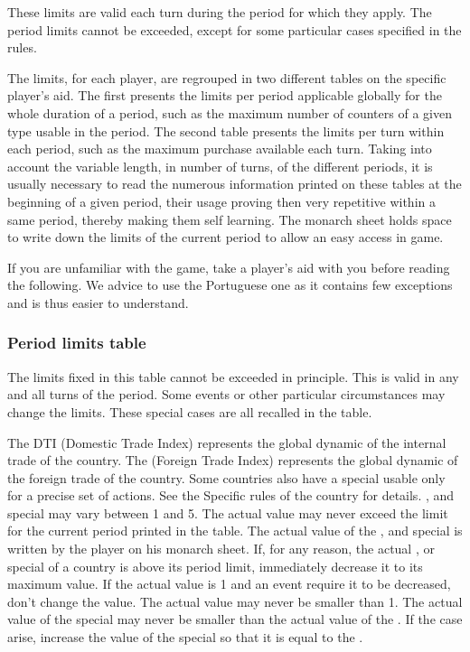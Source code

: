 \aparag[Limits] These limits are valid each turn during the period for which
they apply.
\bparag The period limits cannot be exceeded, except for some particular cases
specified in the rules.

 The limits, for each player, are regrouped in two
different tables on the specific player's aid. The first presents the limits
per period applicable globally for the whole duration of a period, such as the
maximum number of counters of a given type usable in the period. The second
table presents the limits per turn within each period, such as the maximum
purchase available each turn.
\bparag Taking into account the variable length, in number of turns, of the
different periods, it is usually necessary to read the numerous information
printed on these tables at the beginning of a given period, their usage
proving then very repetitive within a same period, thereby making them self
learning.
\bparag The monarch sheet holds space to write down the limits of the current
period to allow an easy access in game.

\begin{exemple}
  If you are unfamiliar with the game, take a player's aid with you before
  reading the following. We advice to use the Portuguese one as it contains
  few exceptions and is thus easier to understand.
\end{exemple}


\subsubsection{Period limits table}
\label{chThePowers:Period Limits}
\aparag The limits fixed in this table cannot be exceeded in principle. This
is valid in any and all turns of the period.
\bparag Some events or other particular circumstances may change the
limits. These special cases are all recalled in the table.

\aparag[Trade] The DTI (Domestic Trade Index) represents the global dynamic of
the internal trade of the country. The \FTI (Foreign Trade Index) represents
the global dynamic of the foreign trade of the country.
\bparag Some countries also have a special \FTI usable only for a precise set
of actions. See the Specific rules of the country for details.
\bparag \DTI, \FTI and special \FTI may vary between 1 and 5.
\bparag The actual value may never exceed the limit for the current period
printed in the table.
\bparag The actual value of the \DTI, \FTI and special \FTI is written by the
player on his monarch sheet.
\bparag If, for any reason, the actual \DTI, \FTI or special \FTI of a country
is above its period limit, %
immediately decrease it to its maximum value.
\bparag If the actual value is 1 and an event require it to be decreased, %
don't change the value. The actual value may never be smaller than 1.
\bparag The actual value of the special \FTI may never be smaller than the
actual value of the \FTI. If the case arise, increase the value of the special
\FTI so that it is equal to the \FTI.

